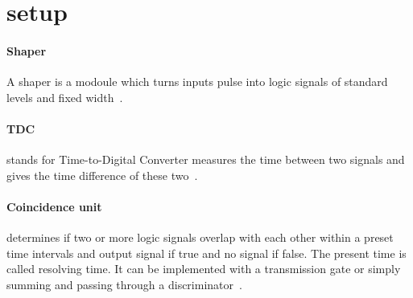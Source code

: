 \section{setup}

\paragraph{Shaper}
A shaper is a modoule which turns inputs pulse into logic signals of standard levels and fixed width~\cite{leo}.

\paragraph{TDC}
stands for Time-to-Digital Converter measures the time between two signals and gives the time difference of these two~\cite{leo}.

\paragraph{Coincidence unit}
determines if two or more logic signals overlap with each other within a preset time intervals and output signal if true and no signal if false. The present time is called resolving time. It can be implemented with a transmission gate or simply summing and passing through a discriminator~\cite{leo}.
